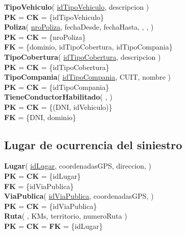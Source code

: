 \textbf{TipoVehiculo}(
    \uline{idTipoVehiculo},
    descripcion
)\\
\textbf{PK} = \textbf{CK} = \{idTipoVehiculo\}\\

\textbf{Poliza}(
    \uline{nroPoliza},
    fechaDesde,
    fechaHasta,
    ,
    ,
)\\
\textbf{PK} = \textbf{CK} = \{nroPoliza\}\\
\textbf{FK} = \{dominio, idTipoCobertura, idTipoCompania\}\\

\textbf{TipoCobertura}(
    \uline{idTipoCobertura},
    descripcion
)\\
\textbf{PK} = \textbf{CK} = \{idTipoCobertura\}\\

\textbf{TipoCompania}(
    \uline{idTipoCompania},
    CUIT,
    nombre
)\\
\textbf{PK} = \textbf{CK} = \{idTipoCompania\}\\

\textbf{TieneConductorHabilitado}(
    \uline{},
    \uline{}
)\\
\textbf{PK} = \textbf{CK} = \{(DNI, idVehiculo)\}\\
\textbf{FK} = \{DNI, dominio\}



\subsection{Lugar de ocurrencia del siniestro}

\textbf{Lugar}(
    \uline{idLugar},
    coordenadasGPS,
    direccion,
)\\
\textbf{PK} = \textbf{CK} = \{idLugar\}\\
\textbf{FK} = \{idViaPublica\}\\

\textbf{ViaPublica}(
    \uline{idViaPublica},
    coordenadasGPS,
)\\
\textbf{PK} = \textbf{CK} = \{idViaPublica\}\\


\textbf{Ruta}(
    \uline{},
    KMs,
    territorio,
    numeroRuta
)\\
\textbf{PK} = \textbf{CK} = \textbf{FK} = \{idLugar\}\\

